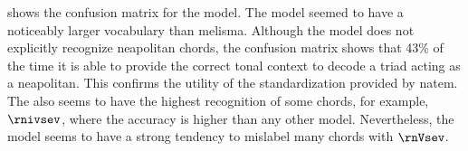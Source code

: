 
 shows the confusion
matrix for the \textcite{chen2021attend} model. The model
seemed to have a noticeably larger vocabulary than
\gls{melisma}. Although the model does not explicitly
recognize \gls{neapolitan} chords, the confusion matrix
shows that 43\% of the time it is able to provide the
correct tonal context to decode a triad acting as a
\gls{neapolitan}. This confirms the utility of the
standardization provided by \gls{natem}. The
\textcite{chen2021attend} also seems to have the highest
recognition of some chords, for example, $\rnivsev$, where
the accuracy is higher than any other model. Nevertheless,
the model seems to have a strong tendency to mislabel many
chords with $\rnVsev$.

